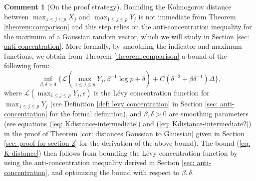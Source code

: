 \documentclass[11pt,reqno]{amsart}
\theoremstyle{definition}
\newtheorem{remark}{Comment}
\newcommand{\LL}{ \mathcal{L}}
\renewcommand{\Pr}{{\mathrm{P}}}
\begin{document}
\begin{remark}[On the proof strategy] Bounding the Kolmogorov distance between $\max_{1 \leq j \leq p}X_{j}$ and $\max_{1 \leq j \leq p}Y_{j}$ is  not immediate from Theorem \ref{theorem:comparison}  and this step relies on the anti-concentration inequality for the maximum of a  Gaussian random vector, which we will study in Section \ref{sec: anti-concentration}. 
More formally, by smoothing the indicator and maximum functions, we obtain from Theorem \ref{theorem:comparison} a bound of the following form:
\[
\inf_{\beta,\delta > 0} \{ \LL(\max_{1 \leq j \leq p} Y_{j},\beta^{-1}\log p+\delta) + C(\delta^{-2}+\beta\delta^{-1}) \Delta \},
\]
where $\LL(\max_{1 \leq j \leq p} Y_{j},\epsilon)$ is the L\'{e}vy concentration function for $\max_{1 \leq j \leq p}Y_{j}$ (see Definition \ref{def: levy concentration} in Section \ref{sec: anti-concentration} for the formal definition), and $\beta,\delta > 0$ are smoothing parameters (see equations (\ref{eq: Kdistance-intermediate}) and (\ref{eq: Kdistance-intermediate2}) in the proof of Theorem \ref{cor: distances Gaussian to Gaussian} given in Section \ref{sec: proof for section 2} for the derivation of the above bound). The bound (\ref{eq: K-distance}) then follows from bounding the L\'{e}vy concentration function by using the anti-concentration inequality derived in Section \ref{sec: anti-concentration}, and optimizing the bound with respect to $\beta,\delta$. 


\end{remark}
\end{document}
